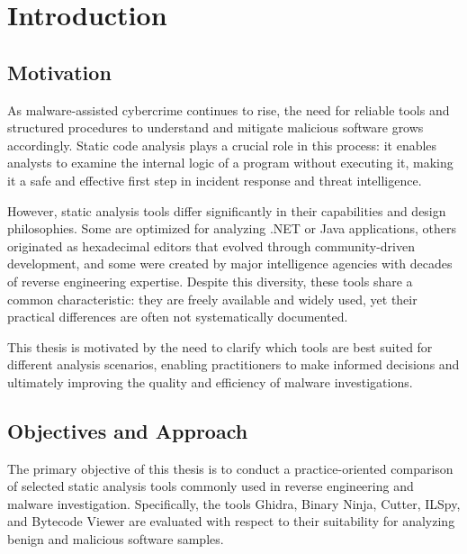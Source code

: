 \cleardoubleoddpage
\chapter{Introduction}
\label{sec:introduction}


\section{Motivation}
\label{sec:introduction:motivation}

As malware-assisted cybercrime continues to rise, the need for reliable tools and structured procedures to understand and mitigate malicious software grows accordingly. 
Static code analysis plays a crucial role in this process: it enables analysts to examine the internal logic of a program without executing it, 
making it a safe and effective first step in incident response and threat intelligence.

However, static analysis tools differ significantly in their capabilities and design philosophies. Some are optimized for analyzing .NET or Java applications, 
others originated as hexadecimal editors that evolved through community-driven development, and some were created by major intelligence agencies with 
decades of reverse engineering expertise. Despite this diversity, these tools share a common characteristic: they are freely available and widely used, 
yet their practical differences are often not systematically documented.

This thesis is motivated by the need to clarify which tools are best suited for different analysis scenarios, enabling practitioners to make informed decisions 
and ultimately improving the quality and efficiency of malware investigations.



\section{Objectives and Approach}
\label{sec:introduction:objectives}

The primary objective of this thesis is to conduct a practice-oriented comparison of selected static analysis tools commonly used in reverse engineering and 
malware investigation. Specifically, the tools Ghidra, Binary Ninja, Cutter, ILSpy, and Bytecode Viewer are evaluated with respect to their suitability for 
analyzing benign and malicious software samples.

